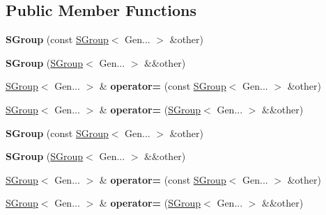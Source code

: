 \subsection*{Public Member Functions}
\begin{DoxyCompactItemize}
\item 
\mbox{\label{class_eigen_1_1_s_group_ade6e736f85ff247053337277b7bb9e57}} 
{\bfseries S\+Group} (const \hyperlink{class_eigen_1_1_s_group}{S\+Group}$<$ Gen... $>$ \&other)
\item 
\mbox{\label{class_eigen_1_1_s_group_ac8122e1296d66ffefab8409edcbf96d1}} 
{\bfseries S\+Group} (\hyperlink{class_eigen_1_1_s_group}{S\+Group}$<$ Gen... $>$ \&\&other)
\item 
\mbox{\label{class_eigen_1_1_s_group_a3b6a40404a2799016872ebb8ad847a5e}} 
\hyperlink{class_eigen_1_1_s_group}{S\+Group}$<$ Gen... $>$ \& {\bfseries operator=} (const \hyperlink{class_eigen_1_1_s_group}{S\+Group}$<$ Gen... $>$ \&other)
\item 
\mbox{\label{class_eigen_1_1_s_group_a46e5bec873c48607a7f11b4863238fdf}} 
\hyperlink{class_eigen_1_1_s_group}{S\+Group}$<$ Gen... $>$ \& {\bfseries operator=} (\hyperlink{class_eigen_1_1_s_group}{S\+Group}$<$ Gen... $>$ \&\&other)
\item 
\mbox{\label{class_eigen_1_1_s_group_ade6e736f85ff247053337277b7bb9e57}} 
{\bfseries S\+Group} (const \hyperlink{class_eigen_1_1_s_group}{S\+Group}$<$ Gen... $>$ \&other)
\item 
\mbox{\label{class_eigen_1_1_s_group_ac8122e1296d66ffefab8409edcbf96d1}} 
{\bfseries S\+Group} (\hyperlink{class_eigen_1_1_s_group}{S\+Group}$<$ Gen... $>$ \&\&other)
\item 
\mbox{\label{class_eigen_1_1_s_group_a3b6a40404a2799016872ebb8ad847a5e}} 
\hyperlink{class_eigen_1_1_s_group}{S\+Group}$<$ Gen... $>$ \& {\bfseries operator=} (const \hyperlink{class_eigen_1_1_s_group}{S\+Group}$<$ Gen... $>$ \&other)
\item 
\mbox{\label{class_eigen_1_1_s_group_a46e5bec873c48607a7f11b4863238fdf}} 
\hyperlink{class_eigen_1_1_s_group}{S\+Group}$<$ Gen... $>$ \& {\bfseries operator=} (\hyperlink{class_eigen_1_1_s_group}{S\+Group}$<$ Gen... $>$ \&\&other)
\end{DoxyCompactItemize}
